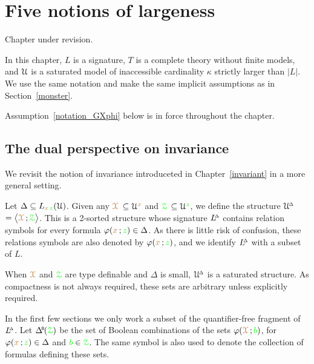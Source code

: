 \chapter{Five notions of largeness}
\label{actions}

\def\medrel#1{\parbox[t]{5ex}{$\displaystyle\hfil #1$}}
\def\ceq#1#2#3{\parbox[t]{17ex}{$\displaystyle #1$}\medrel{#2}{$\displaystyle #3$}}

\noindent\llap{\textcolor{red}{\Large\warning}\kern1.5ex}\ignorespaces
Chapter under revision.

In this chapter, $L$ is a signature, $T$ is a complete theory without finite models, and $\EuScript U$ is a saturated model of inaccessible cardinality $\kappa$ strictly larger than $|L|$.
We use the same notation and make the same implicit assumptions as in Section~\ref{monster}.

Assumption~\ref{notation_GXphi} below is in force throughout the chapter.

\section{The dual perspective on invariance}\label{dual_perspective}

We revisit the notion of invariance introduceted in Chapter~\ref{invariant} in a more general setting.

\begin{assumption}\label{notation_GXphi}
Let $\Delta\subseteq L_{{\color{brown} x}\,{\color{green} z}}(\EuScript U)$.
Given any \emph{${\color{brown}\EuScript X}$\/} $\subseteq\EuScript U^{\color{brown} x}$ and \emph{${\color{green}\EuScript Z}$\/} $\subseteq\EuScript U^{\color{green} z}$, we define the structure \emph{$\EuScript U\kern-.2ex^{\scriptscriptstyle\Delta}$\/} $=\big\langle{\color{brown}\EuScript X}\,;{\color{green}\EuScript Z}\big\rangle$.
This is a 2-sorted structure whose signature \emph{$L\kern-.5ex^{\scriptscriptstyle\Delta}$\/} contains relation symbols for every formula $\varphi({\color{brown} x}\,;{\color{green} z})\in\Delta$.
As there is little risk of confusion, these relations symbols are also denoted by $\varphi({\color{brown} x}\,;{\color{green} z})$, and we identify $L\kern-.5ex^{\scriptscriptstyle\Delta}$ with a subset of $L$.
\end{assumption}

When ${\color{brown}\EuScript X}$ and ${\color{green}\EuScript Z}$ are type definable and $\Delta$ is small, $\EuScript U\kern-.2ex^{\scriptscriptstyle\Delta}$ is a saturated structure.
As compactness is not always required, these sets are arbitrary unless explicitly required.

In the first few sections we only work a subset of the quantifier-free fragment of $L\kern-.5ex^{\scriptscriptstyle\Delta}$.
Let $\BDelta(\grZ)$ be the set of Boolean combinations of the sets $\varphi({\color{brown}\EuScript X}\,;{\color{green} b})$, for $\varphi({\color{brown} x}\,;{\color{green} z})\in\Delta$ and ${\color{green} b}\in{\color{green}\EuScript Z}$.
The same symbol is also used to denote the collection of formulas defining these sets.

